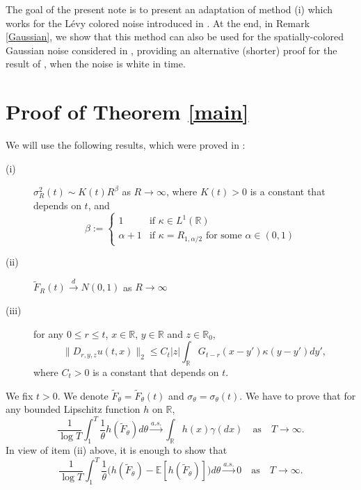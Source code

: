 \documentclass[12pt]{article}
\def\bE{\mathbb{E}}
\def\bR{\mathbb{R}}
\def\k{\kappa}
\newcommand{\lipf}{h}
\begin{document}
 \medskip

The goal of the present note is to present an adaptation of method (i) which works for the L\'evy colored noise introduced in \cite{BJ25}. At the end, in Remark \ref{Gaussian}, we show that this method can also be used for the spatially-colored Gaussian noise considered in \cite{dalang99}, providing an alternative (shorter) proof for the result of \cite{xia-zheng25}, when the noise is white in time.
 
 \section{Proof of Theorem \ref{main}}

We will use the following results, which were proved in \cite{BS26}: 
\begin{description}
\item[(i)] $\sigma_R^2(t) \sim K(t) R^{\beta}$ as $R \to \infty$, where $K(t)>0$ is a constant that depends on $t$, and
    \begin{equation}
\label{def-beta}
\beta:=\left\{
\begin{array}{ll} 1 & \mbox{if $\k \in L^1(\bR)$} \\
\alpha+1 & \mbox{if $\k=R_{1,\alpha/2}$ for some $\alpha \in (0,1)$ }
\end{array} \right.
\end{equation}

\item[(ii)] $\widetilde{F}_R(t) \stackrel{d}{\to} N(0,1)$ as $R\to \infty$

\item[(iii)] for any $0\leq r\leq t$, $x \in \bR$, $y \in \bR$ and $z \in \bR_0$,
\[
\|D_{r,y,z}u(t,x)\|_2 \leq C_t |z|\int_{\bR}G_{t-r}(x-y')\k(y-y')dy',
\]
where $C_t>0$ is a constant that depends on $t$.

\end{description}

We fix $t>0$. We denote $\widetilde{F}_{\theta}=\widetilde{F}_{\theta}(t)$ and $\sigma_{\theta}=\sigma_{\theta}(t)$.
We have to prove that for any bounded Lipschitz function $\lipf$ on $\bR$, 
\[
\frac{1}{\log T}\int_1^T\frac{1}{\theta} \lipf(\widetilde{F}_{\theta})d\theta \stackrel{a.s.}{\longrightarrow} \int_{\bR}\lipf(x)\gamma(dx) \quad \mbox{as} \quad T \to \infty.
\] 
In view of item (ii) above, it is enough to show that
\begin{equation}
\label{claim}
\frac{1}{\log T}\int_1^T\frac{1}{\theta} \Big( \lipf(\widetilde{F}_{\theta})-\bE[\lipf(\widetilde{F}_{\theta})] \Big) d\theta \stackrel{a.s.}{\longrightarrow} 0 \quad \mbox{as} \quad T \to \infty.
\end{equation}
\end{document}

